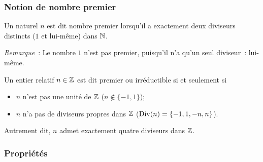 \subsubsection{Notion de nombre premier}

\begin{defdef}
  Un naturel \(n\) est dit nombre premier lorsqu'il a exactement deux diviseurs 
  distincts (\(1\) et lui-même) dans \(\mathbb{N}\).
\end{defdef}

\emph{Remarque}~: Le nombre \(1\) n'est pas premier, puisqu'il n'a qu'un seul 
diviseur~: lui-même.

\begin{defdef}
  Un entier relatif \(n \in \mathbb{Z}\) est dit premier ou irréductible si et seulement 
  si
  \begin{itemize}
    \item \(n\) n'est pas une unité de \(\mathbb{Z}\) (\(n \notin \{-1,1\}\));
    \item \(n\) n'a pas de diviseurs propres dans \(\mathbb{Z}\) (\(\operatorname{Div}(n) = \{-1, 1, 
      -n, n\}\)).
  \end{itemize}
  Autrement dit, \(n\) admet exactement quatre diviseurs dans \(\mathbb{Z}\).
\end{defdef}

\subsubsection{Propriétés}

